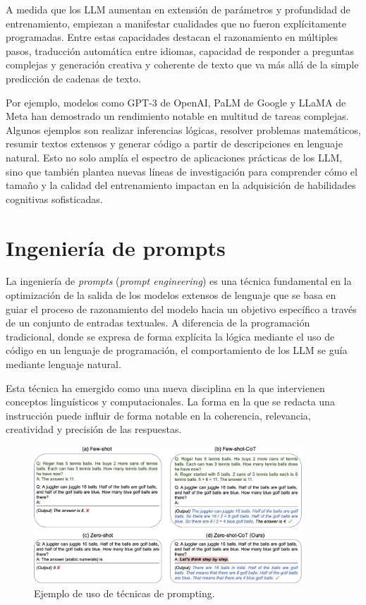 A medida que los LLM aumentan en extensión de parámetros y profundidad de entrenamiento, empiezan a manifestar cualidades
que no fueron explícitamente programadas. Entre estas capacidades destacan el razonamiento en múltiples pasos,
traducción automática entre idiomas, capacidad de responder a preguntas complejas y generación creativa y coherente de texto
que va más allá de la simple predicción de cadenas de texto.

Por ejemplo, modelos como GPT-3\cite{Brown2020GPT3} de OpenAI, PaLM\cite{chowdhery2022palm} de Google 
y LLaMA\cite{touvron2023llama} de Meta han demostrado un rendimiento notable
en multitud de tareas complejas. Algunos ejemplos son realizar inferencias lógicas, resolver problemas matemáticos,
resumir textos extensos y generar código a partir de descripciones en lenguaje natural.
Esto no solo amplía el espectro de aplicaciones prácticas de los LLM,
sino que también plantea nuevas líneas de investigación para comprender cómo el tamaño y
la calidad del entrenamiento impactan en la adquisición de habilidades cognitivas sofisticadas.


\section{Ingeniería de prompts}
La ingeniería de \textit{prompts} (\textit{prompt engineering}) es una técnica fundamental en la optimización de la salida de los modelos extensos de lenguaje
que se basa en guiar el proceso de razonamiento del modelo hacia un objetivo específico a través de un conjunto de entradas textuales.
A diferencia de la programación tradicional, donde se expresa de forma explícita la lógica mediante el uso de código en un lenguaje de programación,
el comportamiento de los LLM se guía mediante lenguaje natural.

Esta técnica ha emergido como una nueva disciplina en la que intervienen conceptos linguísticos y computacionales.
La forma en la que se redacta una instrucción puede influir de forma notable en la coherencia, relevancia, creatividad
y precisión de las respuestas.

\begin{figure}[htbp]
	\centering
	\includegraphics[width=0.9\textwidth]{./Figures/prompting.png}
	\caption{Ejemplo de uso de técnicas de prompting.}
	\label{fig:prompting}
\end{figure}

